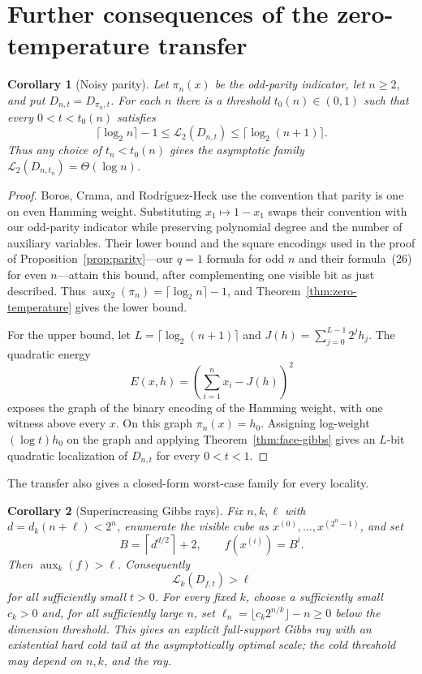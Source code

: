 \documentclass{article}
\newcommand{\LC}{\mathcal{L}}
\newtheorem{corollary}{Corollary}
\begin{document}
\section{Further consequences of the zero-temperature transfer}
\label{app:transfer-consequences}

\begin{corollary}[Noisy parity]
\label{cor:noisy-parity}
Let $\pi_n(x)$ be the odd-parity indicator, let $n\ge2$, and put
$D_{n,t}=D_{\pi_n,t}$.  For each $n$ there is a threshold $t_0(n)\in(0,1)$ such that
every $0<t<t_0(n)$ satisfies
\[
  \lceil\log_2 n\rceil-1
  \le \LC_2(D_{n,t})
  \le \lceil\log_2(n+1)\rceil.
\]
Thus any choice of $t_n<t_0(n)$ gives the asymptotic family
$\LC_2(D_{n,t_n})=\Theta(\log n)$.
\end{corollary}

\begin{proof}
Boros, Crama, and Rodr\'iguez-Heck use the convention that parity is one on
even Hamming weight.  Substituting $x_1\mapsto1-x_1$ swaps their convention
with our odd-parity indicator while preserving polynomial degree and the
number of auxiliary variables.  Their lower bound
\cite[Theorem~5]{bcrh20} and the square encodings used in the proof of
Proposition~\ref{prop:parity}---our $q=1$ formula for odd $n$ and their
formula~(26) for even $n$---attain this bound, after complementing one visible
bit as just described.  Thus
$\operatorname{aux}_2(\pi_n)=\lceil\log_2 n\rceil-1$, and
Theorem~\ref{thm:zero-temperature} gives the lower bound.

For the upper bound, let $L=\lceil\log_2(n+1)\rceil$ and
$J(h)=\sum_{j=0}^{L-1}2^j h_j$.  The quadratic energy
\[
  E(x,h)=\left(\sum_{i=1}^n x_i-J(h)\right)^2
\]
exposes the graph of the binary encoding of the Hamming weight, with one
witness above every $x$.  On this graph $\pi_n(x)=h_0$.  Assigning log-weight
$(\log t)h_0$ on the graph and applying
Theorem~\ref{thm:face-gibbs} gives an $L$-bit quadratic localization of
$D_{n,t}$ for every $0<t<1$.
\end{proof}

The transfer also gives a closed-form worst-case family for every locality.

\begin{corollary}[Superincreasing Gibbs rays]
\label{cor:superincreasing}
Fix $n,k,\ell$ with $d=d_k(n+\ell)<2^n$, enumerate the visible cube as
$x^{(0)},\ldots,x^{(2^n-1)}$, and set
\[
  B=\left\lceil d^{d/2}\right\rceil+2,
  \qquad f(x^{(i)})=B^i.
\]
Then $\operatorname{aux}_k(f)>\ell$.  Consequently
\[
  \LC_k(D_{f,t})>\ell
\]
for all sufficiently small $t>0$.  For every fixed $k$, choose a sufficiently
small $c_k>0$ and, for all sufficiently large $n$, set
$\ell_n=\lfloor c_k2^{n/k}\rfloor-n\ge0$ below the dimension threshold.  This
gives an explicit full-support Gibbs ray with an existential hard cold tail
at the asymptotically optimal scale; the cold threshold may depend on
$n,k$, and the ray.
\end{corollary}
\end{document}
